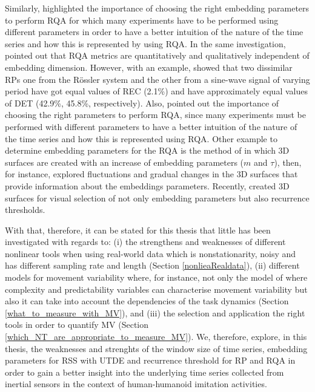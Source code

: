 Similarly, \cite{iwanski1998} highlighted the importance of choosing 
the right embedding parameters to perform RQA for which many experiments 
have to be performed using different parameters in order to have a better 
intuition of the nature of the time series and how this is represented 
by using RQA. In the same investigation, \cite{iwanski1998} pointed out 
that RQA metrics are quantitatively and qualitatively independent of 
embedding dimension. However, with an example, \cite{iwanski1998} 
showed that two dissimilar RPs one from the R\"{o}ssler system and 
the other from a sine-wave signal of varying period have got equal 
values of REC (2.1\%) and have approximately equal values of 
DET (42.9\%, 45.8\%, respectively).
Also, \cite{iwanski1998} pointed out the importance of choosing the 
right parameters to perform RQA, since many experiments must be performed 
with different parameters to have a better intuition of the nature 
of the time series and how this is represented using RQA.
Other example to determine embedding parameters for the RQA 
is the method of \cite{zbilut1992} in which 3D surfaces are created 
with an increase of embedding parameters ($m$ and $\tau$), 
then, for instance, \cite{zbilut1992} explored fluctuations and gradual 
changes in the 3D surfaces that provide information about the embeddings 
parameters. Recently, \cite{marwan2015} created 3D surfaces for visual 
selection of not only embedding parameters but also recurrence thresholds.

With that, therefore, it can be stated for this thesis that little has 
been investigated with regards to: 
(i) the strengthens and weaknesses of different nonlinear tools when 
using real-world data which is nonstationarity, noisy and has different 
sampling rate and length (Section \ref{nonlieaRealdata}),
(ii) different models for movement variability where, for instance, 
not only the model of \cite{stergiou2006} where complexity and 
predictability variables can characterise movement 
variability but also it can take into account the dependencies of the 
task dynamics \citep{vaillancourt2002, vaillancourt2003} (Section 
\ref{what_to_measure_with_MV}), and 
(iii) the selection and application the right tools in order to quantify MV
(Section \ref{which_NT_are_appropriate_to_measure_MV}).
We, therefore, explore, in this thesis, the weaknesses and strenghts of 
the window size of time series, embedding parameters for RSS with UTDE 
and recurrence threshold for RP and RQA in order to gain a 
better insight into the underlying time series collected from inertial 
sensors in the context of human-humanoid imitation activities.


